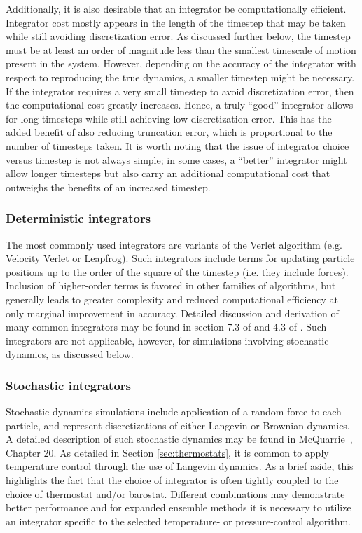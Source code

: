 \documentclass[9pt,bestpractices]{livecoms}
\begin{document}
Additionally, it is also desirable that an integrator be computationally efficient.
Integrator cost mostly appears in the length of the timestep that may be taken while still avoiding discretization error.
As discussed further below, the timestep must be at least an order of magnitude less than the smallest timescale of motion present in the system.
However, depending on the accuracy of the integrator with respect to reproducing the true dynamics, a smaller timestep might be necessary.
If the integrator requires a very small timestep to avoid discretization error, then the computational cost greatly increases.
Hence, a truly ``good'' integrator allows for long timesteps while still achieving low discretization error.
This has the added benefit of also reducing truncation error, which is proportional to the number of timesteps taken.
It is worth noting that the issue of integrator choice versus timestep is not always simple; in some cases, a ``better'' integrator might allow longer timesteps but also carry an additional computational cost that outweighs the benefits of an increased timestep.

\subsubsection{Deterministic integrators}

The most commonly used integrators are variants of the Verlet algorithm (e.g. Velocity Verlet or Leapfrog).
Such integrators include terms for updating particle positions up to the order of the square of the timestep (i.e. they include forces).
Inclusion of higher-order terms is favored in other families of algorithms, but generally leads to greater complexity and reduced computational efficiency at only marginal improvement in accuracy.
Detailed discussion and derivation of many common integrators may be found in section 7.3 of \citet{LeachBook} and 4.3 of \citet{Frenkel:2001:}.
Such integrators are not applicable, however, for simulations involving stochastic dynamics, as discussed below.

\subsubsection{Stochastic integrators}

Stochastic dynamics simulations include application of a random force to each particle, and represent discretizations of either Langevin or Brownian dynamics.
A detailed description of such stochastic dynamics may be found in McQuarrie~\cite{McQuarrieStatMechBook}, Chapter 20.
As detailed in Section \ref{sec:thermostats}, it is common to apply temperature control through the use of Langevin dynamics.
As a brief aside, this highlights the fact that the choice of integrator is often tightly coupled to the choice of thermostat and/or barostat.
Different combinations may demonstrate better performance and for expanded ensemble methods it is necessary to utilize an integrator specific to the selected temperature- or pressure-control algorithm.
\end{document}
